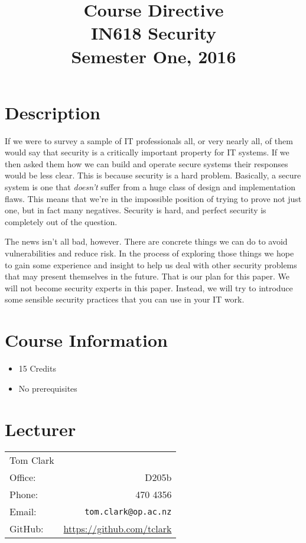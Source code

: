 \documentclass{article}
\begin{document}
\title{Course Directive\\IN618 Security\\Semester One, 2016}
\date{}
\maketitle

\section*{Description}
If we were to survey a sample of IT professionals all, or very nearly all, of them would say that 
security is a critically important property for IT systems.  If we then asked them how we can
build and operate secure systems their responses would be less clear.  This is because security 
is a hard problem. Basically, a secure system is one that \emph{doesn't} suffer from a huge class
of design and implementation flaws.  This means that we're in the impossible position of trying to 
prove not just one, but in fact many negatives. Security is hard, and perfect security is completely 
out of the question.

The news isn't all bad, however. There are concrete things we can do to avoid vulnerabilities and
reduce risk. In the process of exploring those things we hope to gain some experience and insight
to help us deal with other security problems that may present themselves in the future. That is
our plan for this paper. We will not become security experts in this paper.  Instead, we will
try to introduce some sensible security practices that you can use in your IT work.


\section*{Course Information}
\begin{itemize}
  \item 15 Credits
  \item No prerequisites
\end{itemize}

\section*{Lecturer}
\begin{tabular}{lr}

  Tom Clark &    \\
     Office: & D205b \\
     Phone: & 470 4356 \\
     Email: & \texttt{tom.clark@op.ac.nz} \\
     GitHub: & \url{https://github.com/tclark} 
\end{tabular}
\end{document}
